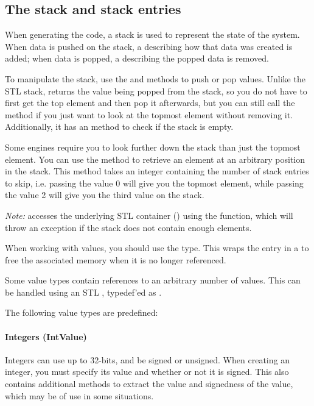 \subsection{The stack and stack entries}
\label{sec:stackvalues}
When generating the code, a stack is used to represent the state of the system. When data is pushed on the stack, a  describing how that data was created is added; when data is popped, a  describing the popped data is removed.

To manipulate the stack, use the  and  methods to push or pop values. Unlike the STL stack,  returns the value being popped from the stack, so you do not have to first get the top element and then pop it afterwards, but you can still call the  method if you just want to look at the topmost element without removing it. Additionally, it has an  method to check if the stack is empty.

Some engines require you to look further down the stack than just the topmost element. You can use the  method to retrieve an element at an arbitrary position in the stack. This method takes an integer containing the number of stack entries to skip, i.e. passing the value 0 will give you the topmost element, while passing the value 2 will give you the third value on the stack.

\emph{Note:}  accesses the underlying STL container () using the  function, which will throw an exception if the stack does not contain enough elements.

When working with values, you should use the  type. This wraps the entry in a  to free the associated memory when it is no longer referenced.

Some value types contain references to an arbitrary number of values. This can be handled using an STL , typedef'ed as .

The following value types are predefined:

\paragraph{Integers (IntValue)}
Integers can use up to 32-bits, and be signed or unsigned. When creating an integer, you must specify its value and whether or not it is signed. This also contains additional methods to extract the value and signedness of the value, which may be of use in some situations.

